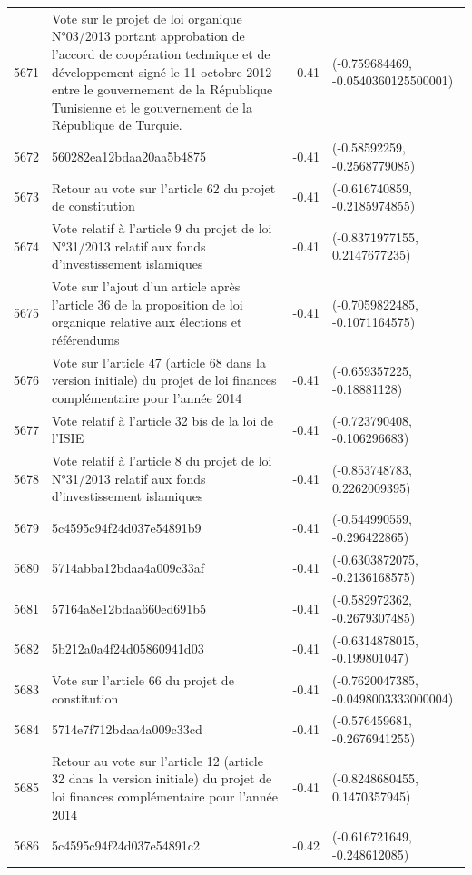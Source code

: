 \begin{table}[ht]
\begin{tabular}{rlrl}
  5671 & Vote sur le projet de loi organique N°03/2013 portant approbation de l'accord de coopération technique et de développement signé le 11 octobre 2012 entre le gouvernement de la République Tunisienne et le gouvernement de la République de Turquie. & -0.41 & (-0.759684469, -0.0540360125500001) \\ 
  5672 & 560282ea12bdaa20aa5b4875 & -0.41 & (-0.58592259, -0.2568779085) \\ 
  5673 & Retour au vote sur l'article 62 du projet de constitution & -0.41 & (-0.616740859, -0.2185974855) \\ 
  5674 & Vote relatif à l'article 9 du projet de loi N°31/2013 relatif aux fonds d'investissement islamiques & -0.41 & (-0.8371977155, 0.2147677235) \\ 
  5675 & Vote sur l'ajout d'un article après l'article 36 de la proposition de loi organique relative aux élections et référendums & -0.41 & (-0.7059822485, -0.1071164575) \\ 
  5676 & Vote sur l'article 47 (article 68 dans la version initiale) du projet de loi finances complémentaire pour l'année 2014 & -0.41 & (-0.659357225, -0.18881128) \\ 
  5677 & Vote relatif à l'article 32 bis de la loi de l'ISIE & -0.41 & (-0.723790408, -0.106296683) \\ 
  5678 & Vote relatif à l'article 8 du projet de loi N°31/2013 relatif aux fonds d'investissement islamiques & -0.41 & (-0.853748783, 0.2262009395) \\ 
  5679 & 5c4595c94f24d037e54891b9 & -0.41 & (-0.544990559, -0.296422865) \\ 
  5680 & 5714abba12bdaa4a009c33af & -0.41 & (-0.6303872075, -0.2136168575) \\ 
  5681 & 57164a8e12bdaa660ed691b5 & -0.41 & (-0.582972362, -0.2679307485) \\ 
  5682 & 5b212a0a4f24d05860941d03 & -0.41 & (-0.6314878015, -0.199801047) \\ 
  5683 & Vote sur l'article 66 du projet de constitution & -0.41 & (-0.7620047385, -0.0498003333000004) \\ 
  5684 & 5714e7f712bdaa4a009c33cd & -0.41 & (-0.576459681, -0.2676941255) \\ 
  5685 & Retour au vote sur l'article 12 (article 32 dans la version initiale) du projet de loi finances complémentaire pour l'année 2014 & -0.41 & (-0.8248680455, 0.1470357945) \\ 
  5686 & 5c4595c94f24d037e54891c2 & -0.42 & (-0.616721649, -0.248612085) \\ 

\end{tabular}
\end{table}
